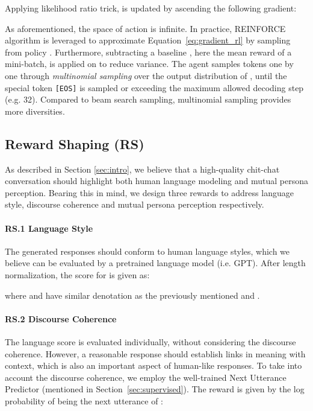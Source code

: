 \documentclass[11pt,a4paper]{article}
\begin{document}
Applying likelihood ratio trick,  is updated by ascending the following gradient:


As aforementioned, the space of action  is infinite. In practice, REINFORCE algorithm \cite{williams1992simple} is leveraged to approximate Equation~\ref{eq:gradient_rl} by sampling  from policy . Furthermore, subtracting a baseline \cite{weaver2001optimal}, here the mean reward of a mini-batch, is applied on  to reduce variance. The agent samples tokens one by one through \emph{multinomial sampling} over the output distribution of , until the special token \texttt{[EOS]} is sampled or exceeding the maximum allowed decoding step (e.g. 32). Compared to beam search sampling, multinomial sampling provides more diversities.

\subsection{Reward Shaping (RS)}\label{sec:reward}

As described in Section \ref{sec:intro}, we believe that a high-quality chit-chat conversation should highlight both human language modeling and mutual persona perception. Bearing this in mind, we design three rewards to address language style, discourse coherence and mutual persona perception respectively.

\paragraph{RS.1 Language Style} The generated responses should conform to human language styles, which we believe can be evaluated by a pretrained language model (i.e. GPT). After length normalization, the score for  is given as:

where  and  have similar denotation as the previously mentioned  and .

\paragraph{RS.2 Discourse Coherence} The language score is evaluated individually, without considering the discourse coherence. However, a reasonable response should establish links in meaning with context, which is also an important aspect of human-like responses. To take into account the discourse coherence, we employ the well-trained Next Utterance Predictor (mentioned in Section~\ref{sec:supervised}). The reward is given by the log probability of  being the next utterance of :
\end{document}

